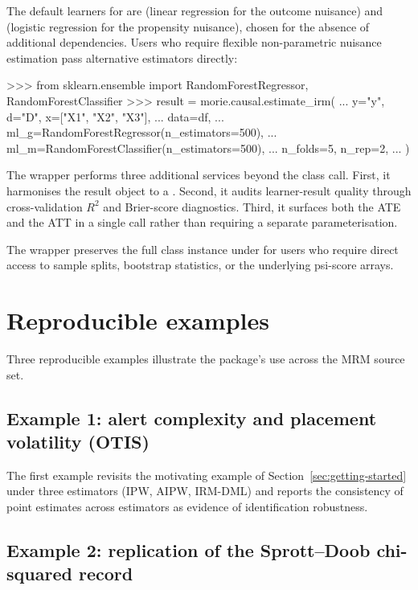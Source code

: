 \documentclass[article,shortnames,nojss]{jss}
\newcommand{\OTIS}{\textsf{OTIS}}
\begin{document}
The default learners for  are
 (linear regression for the outcome
nuisance) and  (logistic regression
for the propensity nuisance), chosen for the absence of
additional dependencies. Users who require flexible non-parametric
nuisance estimation pass alternative  estimators
directly:

\begin{Code}
>>> from sklearn.ensemble import RandomForestRegressor, RandomForestClassifier
>>> result = morie.causal.estimate_irm(
...     y="y", d="D", x=["X1", "X2", "X3"],
...     data=df,
...     ml_g=RandomForestRegressor(n_estimators=500),
...     ml_m=RandomForestClassifier(n_estimators=500),
...     n_folds=5, n_rep=2,
... )
\end{Code}

\noindent The wrapper performs three additional services beyond
the  class call. First, it harmonises the result
object to a . Second, it audits learner-result
quality through cross-validation $R^{2}$ and Brier-score
diagnostics. Third, it surfaces both the ATE and the ATT in a
single call rather than requiring a separate 
parameterisation.

The wrapper preserves the full  class instance under
 for users who require direct access to
sample splits, bootstrap statistics, or the underlying psi-score
arrays.

\section{Reproducible examples}
\label{sec:examples}

Three reproducible examples illustrate the package's use across
the MRM source set.

\subsection[Example 1: alert complexity and placement volatility (OTIS)]{Example 1: alert complexity and placement volatility (\OTIS{})}

The first example revisits the motivating example of
Section~\ref{sec:getting-started} under three estimators
(IPW, AIPW, IRM-DML) and reports the consistency of point
estimates across estimators as evidence of identification
robustness.

\subsection{Example 2: replication of the Sprott--Doob chi-squared
record}
\end{document}
